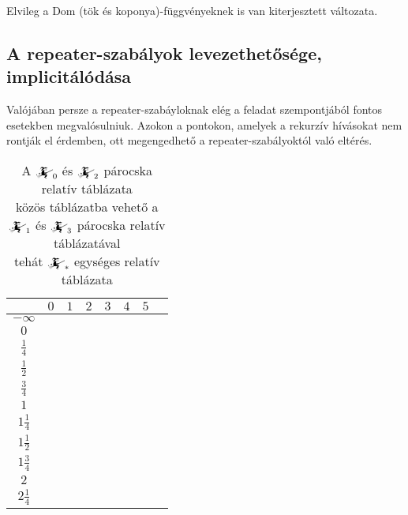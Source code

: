 \documentclass{article}
\newcommand{\blk}{\cellcolor{darkgray}}
\newcommand{\red}{\cellcolor{red!33}}
\newcommand{\grn}{\cellcolor{green!33}}
\newcommand{\nothing}{\text{\raisebox{0.4em}{\rotatebox{180}{$\curvearrowleft$}}}}%
\newcommand{\just}[1]{\boxed{#1}}%
\newcommand{\incl}{\mathbf{incl}}
\newcommand{\excl}{\mathbf{excl}}
\newcommand{\currymainfun}[1]{\mathwitch_{#1}}
\begin{document}
	Elvileg a Dom (tök és koponya)-függvényeknek is van kiterjesztett változata.

	\subsection{A repeater-szabályok levezethetősége, implicitálódása}

	Valójában persze a repeater-szabáyloknak elég a feladat szempontjából fontos esetekben megvalósulniuk. Azokon a pontokon, amelyek a rekurzív hívásokat nem rontják el érdemben, ott megengedhető a repeater-szabályoktól való eltérés.

	\begin{table}[H]
		\caption*{A $\currymainfun0$ és $\currymainfun2$ párocska relatív táblázata\\közös táblázatba vehető a $\currymainfun1$ és $\currymainfun3$ párocska relatív táblázatával\\tehát $\currymainfun{*}$ egységes relatív táblázata}
		\centering
		\begin{tabular}{c||c|c|c|c|c|c|c|}
				&	$0$		&	$1$		&	$2$		&	$3$		&	$4$		&	$5$		\\\hline\hline
		$-\infty$	&	\nothing	&	\nothing	&	\nothing	&	\nothing	&	\nothing	&	\nothing	\\\hline
			$0$	&	\nothing	&	\nothing	&	\nothing	&	\nothing	&	\nothing	&	\grn\just\incl	\\\hline
		$\frac14$	&	\nothing	&	\nothing	&	\nothing	&	\nothing	&	\nothing	&	\grn\just\incl	\\\hline
		$\frac12$	&	\red\just\excl	&	\nothing	&	\nothing	&	\nothing	&	\nothing	&	\grn\just\incl	\\\hline
		$\frac34$	&	\red\just\excl	&	\nothing	&	\nothing	&	\nothing	&	\nothing	&	\grn\just\incl	\\\hline
			$1$	&	\red\just\excl	&	\nothing	&	\nothing	&	\nothing	&	\grn\just\incl	&	\blk		\\\hline
		$1\frac14$	&	\red\just\excl	&	\nothing	&	\nothing	&	\nothing	&	\grn\just\incl	&	\blk		\\\hline
		$1\frac12$	&	\blk		&	\red\just\excl	&	\nothing	&	\nothing	&	\grn\just\incl	&	\blk		\\\hline
		$1\frac34$	&	\blk		&	\red\just\excl	&	\nothing	&	\nothing	&	\grn\just\incl	&	\blk		\\\hline
			$2$	&	\blk		&	\red\just\excl	&	\nothing	&	\grn\just\incl	&	\blk		&	\blk		\\\hline
		$2\frac14$	&	\blk		&	\red\just\excl	&	\nothing	&	\grn\just\incl	&	\blk		&	\blk		\\\hline

\end{tabular}
\end{table}
\end{document}

